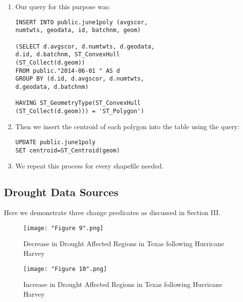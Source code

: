 \documentclass[conference]{IEEEtran}
\begin{document}
\begin{enumerate}
	\item Our query for this purpose was:
\begin{lstlisting}
INSERT INTO public.june1poly (avgscor, 
numtwts, geodata, id, batchnm, geom)

(SELECT d.avgscor, d.numtwts, d.geodata, 
d.id, d.batchnm, ST_ConvexHull
(ST_Collect(d.geom))
FROM public."2014-06-01 " AS d
GROUP BY (d.id, d.avgscor, d.numtwts,
d.geodata, d.batchnm)

HAVING ST_GeometryType(ST_ConvexHull
(ST_Collect(d.geom))) = 'ST_Polygon')
\end{lstlisting}
	\item Then we insert the centroid of each polygon into the table using the query:

\begin{lstlisting}
UPDATE public.june1poly 
SET centroid=ST_Centroid(geom)
\end{lstlisting}

	\item We repeat this process for every shapefile needed.
\end{enumerate}

\subsection{Drought Data Sources}

Here we demonstrate three change predicates as discussed in Section III.

\begin{figure}[h]
\centerline{\texttt{[image: "Figure 9".png]}}
\caption{Decrease in Drought Affected Regions in Texas following Hurricane Harvey}
\label{Figure 9}
\end{figure}

\begin{figure}[h]
\centerline{\texttt{[image: "Figure 10".png]}}
\caption{Increase in Drought Affected Regions in Texas following Hurricane Harvey}
\label{Figure 10}
\end{figure}
\end{document}
